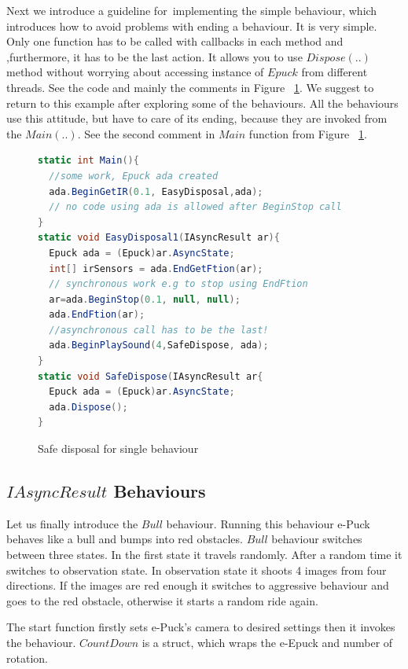   Next we introduce a guideline for~implementing the simple behaviour,
  which introduces how to avoid problems with ending a behaviour.
  It is very simple. Only one function has to be called  with callbacks in each method and 
  ,furthermore, it has to be the last action. It allows you to use $Dispose(..)$ method 
  without worrying about accessing instance of $Epuck$  from different threads.
  See the code and mainly the comments in Figure ~\ref{safedis}. 
  We suggest to return to this example after exploring some of the behaviours.
  All the behaviours use this attitude, but have to care of its ending, 
  because they are invoked from the $Main(..)$. 
  See the second comment in $Main$ function from Figure ~\ref{safedis}.

\begin{figure}[!hbp]	
\begin{lstlisting}[language=cs]
static int Main(){
  //some work, Epuck ada created
  ada.BeginGetIR(0.1, EasyDisposal,ada);
  // no code using ada is allowed after BeginStop call
}
static void EasyDisposal1(IAsyncResult ar){
  Epuck ada = (Epuck)ar.AsyncState;
  int[] irSensors = ada.EndGetFtion(ar);
  // synchronous work e.g to stop using EndFtion
  ar=ada.BeginStop(0.1, null, null);
  ada.EndFtion(ar);
  //asynchronous call has to be the last!
  ada.BeginPlaySound(4,SafeDispose, ada);
}
static void SafeDispose(IAsyncResult ar{
  Epuck ada = (Epuck)ar.AsyncState;
  ada.Dispose();
}
\end{lstlisting}
\caption{Safe disposal for single behaviour} \label{safedis}
\end{figure}

\subsection{$IAsyncResult$ Behaviours}\label{sec:bull}
  Let us finally introduce the $Bull$ behaviour.
  Running this behaviour e-Puck behaves like a bull and bumps into red obstacles.
  $Bull$ behaviour switches between three states. In the first state it travels randomly. 
  After a random time it switches to observation state.
  In observation state it shoots 4 images from four directions. If the images are red enough 
  it switches to aggressive behaviour and goes to the red obstacle,
  otherwise it starts a random ride again.

  The start function firstly sets e-Puck's camera to desired settings then it invokes the behaviour.
  $CountDown$ is a struct, which wraps the e-Epuck and number of rotation.

